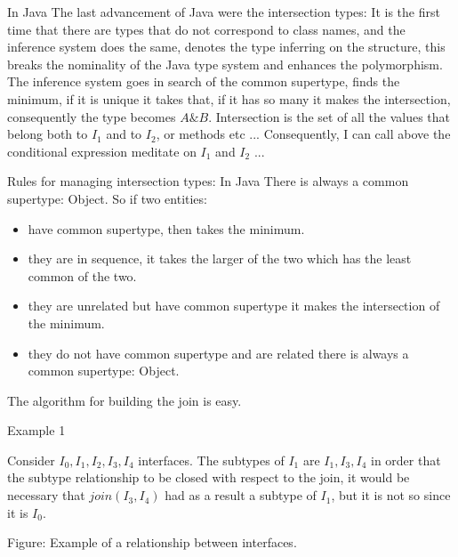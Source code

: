 \documentclass{beamer}
\begin{document}
\begin{frame}{In Java}
    The last advancement of Java were the intersection types:\newline
    It is the first time that there are types that do not correspond to class names, and the inference system does the same, denotes the type inferring on the structure, this breaks the nominality of the Java type system and enhances the polymorphism.\newline\newline
    The inference system goes in search of the common supertype, finds the minimum, if it is unique it takes that, if it has so many it makes the intersection, consequently the type becomes $A\&B$.\newline\newline
    Intersection is the set of all the values that belong both to $I_1$ and to $I_2$, or methods etc ... Consequently, I can call above the conditional expression meditate on $I_1$ and $I_2$ ...
\end{frame}

\begin{frame}{Rules for managing intersection types: In Java}
There is always a common supertype: Object.\newline
So if two entities:
\begin{itemize}
\item  have common supertype, then takes the minimum.
\item  they are in sequence, it takes the larger of the two which has the least common of the two.
\item  they are unrelated but have common supertype it makes the intersection of the minimum.
\item  they do not have common supertype and are related there is always a common supertype: Object.
\end{itemize}
The algorithm for building the join is easy.
    
\end{frame}

\begin{frame}{Example 1}

Consider $I_0,I_1,I_2,I_3,I_4$ interfaces.\newline
The subtypes of $I_1$ are $I_1, I_3, I_4$ in order that the subtype relationship to be closed with respect to the join, it would be necessary that $join(I_3,I_4)$ had as a result a subtype of $I_1$, but it is not so since it is $I_0$.
\begin{center}
\end{center}
Figure: Example of a relationship between interfaces.
\end{frame}
\end{document}
